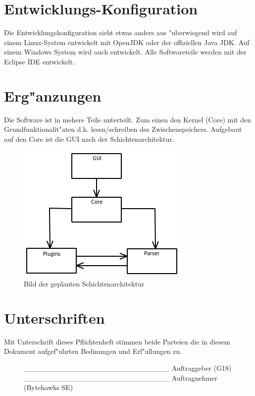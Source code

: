 \documentclass[a4paper,11pt,abstracton,titlepage]{scrartcl}
\begin{document}
\section{Entwicklungs-Konfiguration}
Die Entwicklungskonfiguration sieht etwas anders aus "uberwiegend wird auf einem Linux-System entwickelt mit OpenJDK oder der offiziellen Java\footnotesize{\texttrademark} \normalsize JDK.
Auf einem Windows System wird auch entwickelt. Alle Softwareteile werden mit der Eclipse IDE entwickelt. 
\section{Erg"anzungen}
Die Software ist in mehere Teile unterteilt. Zum einen den Kernel (Core) mit den Grundfunktionalit"aten d.h. lesen/schreiben des Zwischenspeichers. Aufgebaut auf den Core ist die GUI nach der Schichtenarchitektur. \newline
\begin{figure}[htbp]
\centering
\includegraphics[scale=0.7]{Schichtenarchitektur}
\caption{Bild der geplanten Schichtenarchitektur}
\end{figure}
\newpage
\section{Unterschriften}
Mit Unterschrift dieses Pflichtenheft stimmen beide Parteien die in diesem Dokument aufgef"uhrten Bedinungen und Erf"ullungen zu. 
\newline\newline
\begin{figure}[htdp]
\_\_\_\_\_\_\_\_\_\_\_\_\_\_\_\_\_\_\_\_\_\_\_\_\_\_\_\_\newline
Auftraggeber (G18) \newline
\newline\newline
\_\_\_\_\_\_\_\_\_\_\_\_\_\_\_\_\_\_\_\_\_\_\_\_\_\_\_\_\newline
Auftragnehmer (Bytehawks SE)\newline
\end{figure}
\end{document}
